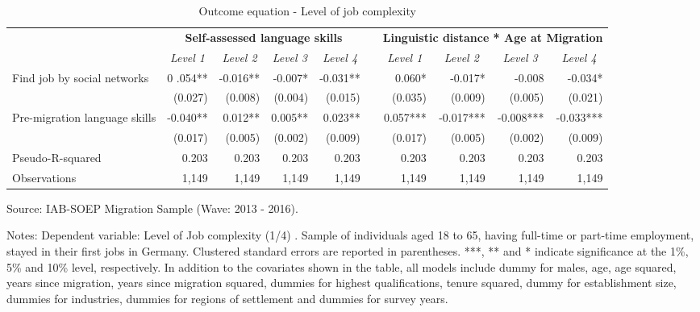 \documentclass[12pt,a4paper]{article}
\begin{document}
\begin{landscape}
\begin{table}[htbp]
  \centering
  \caption{Outcome equation - Level of job complexity}
    \begin{tabular}{p{15em}rrrrrrrrr}
    \toprule
    \toprule
    \multicolumn{1}{r}{} & \multicolumn{4}{c}{\textbf{Self-assessed language skills}} &       & \multicolumn{4}{c}{\textbf{Linguistic distance * Age at Migration}} \\
\cmidrule{2-5}\cmidrule{7-10}    \multicolumn{1}{r}{} & \multicolumn{1}{c}{\textit{Level 1}} & \multicolumn{1}{c}{\textit{Level 2}} & \multicolumn{1}{c}{\textit{Level 3}} & \multicolumn{1}{c}{\textit{Level 4}} &       & \multicolumn{1}{c}{\textit{Level 1}} & \multicolumn{1}{c}{\textit{Level 2}} & \multicolumn{1}{c}{\textit{Level 3}} & \multicolumn{1}{c}{\textit{Level 4}} \\
    \midrule
    \multicolumn{1}{l}{Find job by social networks} & 0 .054** & -0.016** & -0.007* & -0.031** &       &  0.060* &  -0.017* &  -0.008 &  -0.034* \\
    \multicolumn{1}{l}{                         } & (0.027) & (0.008) & (0.004) & (0.015) &       & (0.035) & (0.009) & (0.005) & (0.021) \\
    Pre-migration language skills & -0.040** & 0.012** & 0.005** & 0.023** &       &  0.057*** &  -0.017*** &  -0.008*** &  -0.033*** \\
    \multicolumn{1}{l}{                         } & (0.017) & (0.005) & (0.002) & (0.009) &       & (0.017) & (0.005) & (0.002) & (0.009) \\
    \multicolumn{1}{l}{Pseudo-R-squared} & 0.203 & 0.203 & 0.203 & 0.203 &       & 0.203 & 0.203 & 0.203 & 0.203 \\
    Observations &        1,149    &        1,149    &        1,149    &        1,149    &       &         1,149    &         1,149    &         1,149    &         1,149    \\
    \bottomrule
    \end{tabular}%
\begin{tablenotes}
      \small
      \item Source: IAB-SOEP Migration Sample (Wave: 2013 - 2016).
      \item Notes: Dependent variable: Level of Job complexity (1/4) . Sample of individuals aged 18 to 65, having full-time or part-time employment, stayed in their first jobs in Germany. Clustered standard errors are reported in parentheses.  ***, ** and * indicate significance at the 1\%, 5\% and 10\% level, respectively. In addition to the covariates shown in the table, all models include dummy for males, age, age squared, years since migration, years since migration squared, dummies for highest qualifications, tenure squared, dummy for establishment size, dummies for industries, dummies for regions of settlement and dummies for survey years.
    \end{tablenotes}
\end{table}%

\end{landscape}
\end{document}

